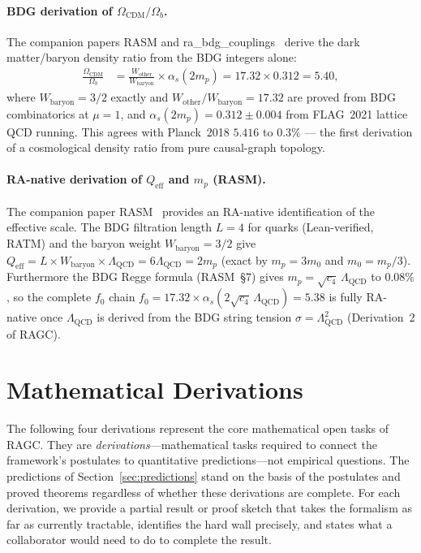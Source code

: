\documentclass[11pt,a4paper]{article}
\theoremstyle{plain}
\theoremstyle{definition}
\theoremstyle{remark}
\begin{document}
\paragraph{BDG derivation of $\Omega_{\mathrm{CDM}}/\Omega_b$.}
The companion papers RASM and ra\_bdg\_couplings~\citep{Sandeman2026RASM,Sandeman2026BDG}
derive the dark matter/baryon density ratio from the BDG integers alone:
\begin{align}
  \frac{\Omega_{\mathrm{CDM}}}{\Omega_b}
  &= \frac{W_{\mathrm{other}}}{W_{\mathrm{baryon}}} \times \alpha_s(2m_p)
   = 17.32 \times 0.312 = 5.40,
  \label{eq:f0_ragc}
\end{align}
where $W_{\mathrm{baryon}} = 3/2$ exactly and $W_{\mathrm{other}}/W_{\mathrm{baryon}} = 17.32$
are proved from BDG combinatorics at $\mu=1$, and $\alpha_s(2m_p) = 0.312\pm
0.004$ from FLAG~2021 lattice QCD running.  This agrees with Planck~2018
$5.416$ to $0.3\%$ --- the first derivation of a cosmological density ratio
from pure causal-graph topology.

\paragraph{RA-native derivation of $Q_{\mathrm{eff}}$ and $m_p$ (RASM).}
The companion paper RASM~\citep{Sandeman2026RASM} provides an RA-native
identification of the effective scale.  The BDG filtration length $L=4$ for
quarks (Lean-verified, RATM) and the baryon weight $W_{\mathrm{baryon}}=3/2$
give $Q_{\mathrm{eff}} = L\times W_{\mathrm{baryon}}\times\Lambda_{\mathrm{QCD}}
= 6\Lambda_{\mathrm{QCD}} = 2m_p$ (exact by $m_p=3m_0$ and $m_0=m_p/3$).
Furthermore the BDG Regge formula (RASM~\S7) gives $m_p = \sqrt{c_4}\,\Lambda_{\mathrm{QCD}}$
to $0.08\%$, so the complete $f_0$ chain
$f_0 = 17.32\times\alpha_s(2\sqrt{c_4}\,\Lambda_{\mathrm{QCD}}) = 5.38$
is fully RA-native once $\Lambda_{\mathrm{QCD}}$ is derived from the
BDG string tension $\sigma = \Lambda_{\mathrm{QCD}}^2$ (Derivation~2 of RAGC).

\section{Mathematical Derivations}
\label{sec:math}

The following four derivations represent the core mathematical open tasks of
RAGC. They are \emph{derivations}---mathematical tasks required to connect the
framework's postulates to quantitative predictions---not empirical questions.
The predictions of Section~\ref{sec:predictions} stand on the basis of the
postulates and proved theorems regardless of whether these derivations are complete.
For each derivation, we provide a partial result or proof sketch that takes the
formalism as far as currently tractable, identifies the hard wall precisely, and
states what a collaborator would need to do to complete the result.
\end{document}
